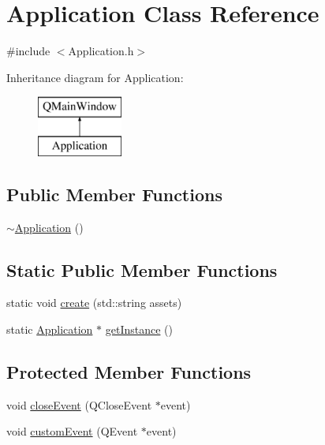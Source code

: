 \hypertarget{class_application}{\section{Application Class Reference}
\label{class_application}
}


{\ttfamily \#include $<$Application.\-h$>$}

Inheritance diagram for Application\-:\begin{figure}[H]
\begin{center}
\leavevmode
\includegraphics[height=2.000000cm]{class_application}
\end{center}
\end{figure}
\subsection*{Public Member Functions}
\begin{DoxyCompactItemize}
\item 
\hyperlink{class_application_a748bca84fefb9c12661cfaa2f623748d}{$\sim$\-Application} ()
\end{DoxyCompactItemize}
\subsection*{Static Public Member Functions}
\begin{DoxyCompactItemize}
\item 
static void \hyperlink{class_application_a8eb19fef68c6c556f069ab894192ad8c}{create} (std\-::string assets)
\item 
static \hyperlink{class_application}{Application} $\ast$ \hyperlink{class_application_ab5dba709d2e806d5d83c297bab6cdace}{get\-Instance} ()
\end{DoxyCompactItemize}
\subsection*{Protected Member Functions}
\begin{DoxyCompactItemize}
\item 
void \hyperlink{class_application_a0170cac84e135e75e3177ed2d185ba0a}{close\-Event} (Q\-Close\-Event $\ast$event)
\item 
void \hyperlink{class_application_a3151617f344f6a246ba47b6db79c3778}{custom\-Event} (Q\-Event $\ast$event)
\end{DoxyCompactItemize}

